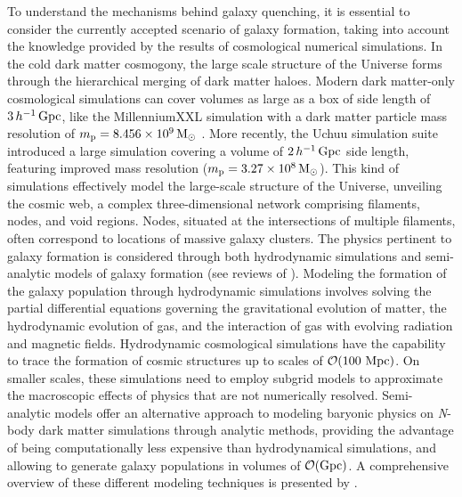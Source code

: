 \documentclass[baaa]{baaa}
\begin{document}
To understand the mechanisms behind galaxy quenching, it is essential to consider the currently accepted scenario of galaxy formation, taking into account the knowledge provided by the results of cosmological numerical simulations.
In the cold dark matter cosmogony, the large scale structure of the Universe forms through the hierarchical merging
of dark matter haloes.
Modern dark matter-only cosmological simulations can  cover volumes as large as a box of side length of $3\,h^{-1}\,{\rm Gpc}$, like the MillenniumXXL simulation with a dark matter particle mass resolution of $m_{\rm p}=8.456 \times 10^9 \, {\rm M_{\odot}}$ \citep{Angulo_2012}. More recently, the Uchuu simulation suite \citep{Ishiyama_2021} 
introduced a large simulation covering a volume of $2\,h^{-1}\,{\rm Gpc}$ side length, featuring improved mass resolution
($m_{\rm p}=3.27 \times 10^8 \, {\rm M_{\odot}}$).
 This kind of simulations 
 effectively model the large-scale structure of the Universe, unveiling the cosmic web, a complex three-dimensional network comprising filaments, nodes, and void regions. Nodes, situated at the intersections of multiple filaments, often correspond to locations of massive galaxy clusters.  
The physics pertinent to galaxy formation is considered through both hydrodynamic simulations \citep[see][for a review]{Crain_2023} and semi-analytic models of galaxy formation (see reviews of \citealt{Baugh_2006, Benson_2010}).
Modeling the formation of the galaxy population through hydrodynamic simulations involves solving the partial differential equations governing
the gravitational evolution of matter,
the hydrodynamic evolution of gas, and
the interaction of gas with evolving radiation and magnetic fields.
Hydrodynamic cosmological simulations have the capability to trace the formation of cosmic structures up to scales of $\mathcal O(100~{\rm Mpc})$. On smaller scales, these simulations need to employ subgrid models to approximate the macroscopic effects of physics that are not numerically resolved.
Semi-analytic models offer an alternative approach to modeling baryonic physics on {\em N}-body dark matter simulations through analytic methods, providing the advantage of being computationally less expensive than hydrodynamical simulations, and allowing to generate galaxy populations in volumes of $\mathcal O({\rm Gpc})$. A comprehensive overview of these different modeling techniques is presented by \cite{Vogelsberger_2020}.
\end{document}
